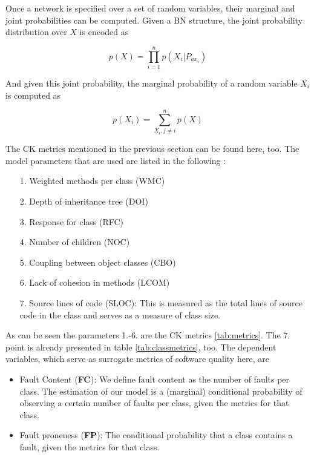 Once a network is specified over a set of random variables, their marginal and joint probabilities can be computed.
Given a BN structure, the joint probability distribution over $X$ is encoded as

\begin{displaymath}
	p(X)= \prod_{i=1}^{n}p(X_i|P_{ax_i})
\end{displaymath}

And given this joint probability, the marginal probability of a random variable $X_i$ is computed as 

\begin{displaymath}
	p(X_i)= \sum_{X_i,j\neq i}^{n}p(X)
\end{displaymath}

The CK metrics mentioned in the previous section can be found here, too. The model parameters that are used are listed in the following \cite{b9pai2007empirical}: 

\begin{itemize}
	\item[1.] Weighted methods per class (WMC)
	\item[2.] Depth of inheritance tree (DOI)
	\item[3.] Response for class (RFC)
	\item[4.] Number of children (NOC)
	\item[5.] Coupling between object classes (CBO)
	\item[6.] Lack of cohesion in methods (LCOM)
	\item[7.] Source lines of code (SLOC): This is measured as the total lines of source code in the class and serves as a measure of class size.
\end{itemize}

As can be seen the parameters 1.-6. are the CK metrics \ref{tab:metrics}. The 7. point is already presented in table \ref{tab:classmetrics}, too.
The dependent variables, which serve as surrogate metrics of software quality here, are
\begin{itemize}
	\item Fault Content (\textbf{FC}): We define fault content as the number of faults per class. The estimation of our model is a (marginal) conditional probability of observing a certain number of faults per class, given the metrics for that class.
	\item Fault proneness (\textbf{FP}): The conditional probability that a class contains a fault, given the metrics for that class.
\end{itemize}

